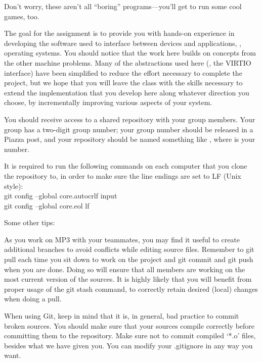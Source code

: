 \documentclass{article}
\begin{document}
Don't worry, these aren't all ``boring'' programs---you'll get to run some cool games, too.

The goal for the assignment is to provide you with hands-on experience
in developing the software used to interface between devices and
applications, \ie, operating systems.  You should notice that the work here
builds on concepts from the other machine problems.
Many of the abstractions used here (\eg, the VIRTIO interface) have been simplified
to reduce the effort necessary to complete the project, but we hope that
you will leave the class with the skills necessary to extend the implementation
that you develop here along whatever direction you choose, by incrementally
improving various aspects of your system.
\\



You should receive access to a shared repository with your group members.
Your group has a two-digit group number; your group number should be
released in a Piazza post, and your repository should be named something like
	{}, where {} is your number.

It is required to run the following commands on each computer that you clone the repository to, in order to make sure the line endings are set to LF (Unix style):\\
{\fix{} git config --global core.autocrlf input}\\
{\fix{} git config --global core.eol lf}

Some other tips:

As you work on MP3 with your teammates, you may find it useful to create additional branches to avoid conflicts while editing source files. 
Remember to {\fix{} git pull} each time you sit down to work on the project and {\fix{} git commit} and {\fix{} git push} when you
are done.
Doing so will ensure that all members are working on the most current version of the sources.
It is highly likely that you will benefit from proper usage of the {\fix{} git stash} command, to correctly retain desired
(local) changes when doing a pull.

When using Git, keep in mind that it is, in general, bad practice to commit broken sources.
You should make sure that your sources compile correctly before committing them to the repository.
Make sure not to commit compiled `*.o' files, besides what we have given you. You can modify your {\fix .gitignore} in any way you want.
\end{document}
